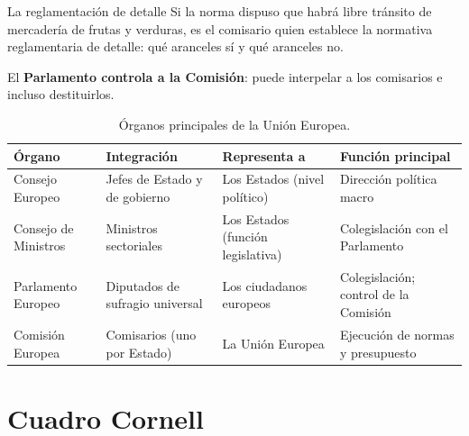 \documentclass[12pt,oneside]{book}
\begin{document}
\begin{ejemplo}{La reglamentación de detalle}
Si la norma dispuso que habrá libre tránsito de mercadería de frutas y verduras, es el comisario quien establece la normativa reglamentaria de detalle: qué aranceles sí y qué aranceles no.
\end{ejemplo}

El \textbf{Parlamento controla a la Comisión}: puede interpelar a los comisarios e incluso destituirlos.

\begin{table}[H]
\centering
\renewcommand{\arraystretch}{1.3}
\begin{tabularx}{\textwidth}{>{\raggedright\arraybackslash}p{}>{\raggedright\arraybackslash}X>{\raggedright\arraybackslash}X>{\raggedright\arraybackslash}X}
\toprule
\textbf{Órgano} & \textbf{Integración} & \textbf{Representa a} & \textbf{Función principal} \\
\midrule
Consejo Europeo & Jefes de Estado y de gobierno & Los Estados (nivel político) & Dirección política macro \\
Consejo de Ministros & Ministros sectoriales & Los Estados (función legislativa) & Colegislación con el Parlamento \\
Parlamento Europeo & Diputados de sufragio universal & Los ciudadanos europeos & Colegislación; control de la Comisión \\
Comisión Europea & Comisarios (uno por Estado) & La Unión Europea & Ejecución de normas y presupuesto \\
\bottomrule
\end{tabularx}
\caption{Órganos principales de la Unión Europea.}
\end{table}

\section{Cuadro Cornell}
\end{document}
